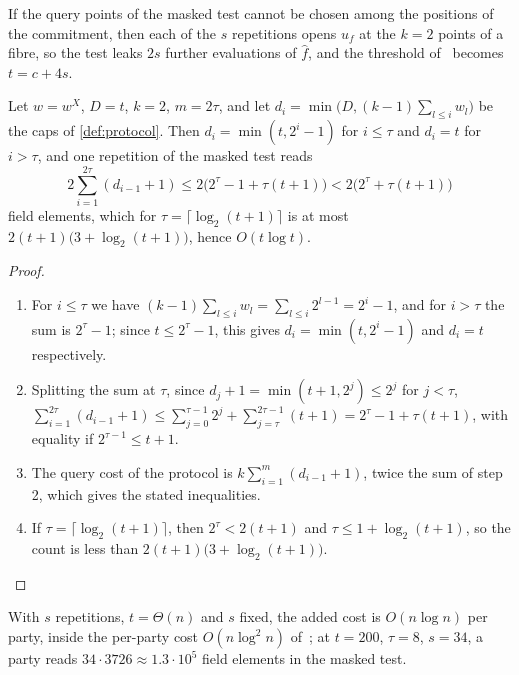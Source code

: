 \begin{remark}\label{rem:avss-leak}
If the query points of the masked test cannot be chosen among the positions of the commitment,
then each of the $s$ repetitions opens $u_f$ at the $k=2$ points of a fibre, so the test leaks
$2s$ further evaluations of $\hat f$, and the threshold of~\cite[\S4, App.~D]{PolyFRIM} becomes
$t=c+4s$.
\end{remark}

\begin{proposition}\label{prop:avss-cost}
Let $w=w^X$, $D=t$, $k=2$, $m=2\tau$, and let $d_i=\min\big(D,(k-1)\sum_{l\le i}w_l\big)$ be
the caps of \cref{def:protocol}. Then $d_i=\min(t,2^i-1)$ for $i\le\tau$ and $d_i=t$ for
$i>\tau$, and one repetition of the masked test reads
\[
2\sum_{i=1}^{2\tau}(d_{i-1}+1)\le2\big(2^\tau-1+\tau(t+1)\big)<2\big(2^\tau+\tau(t+1)\big)
\]
field elements, which for $\tau=\lceil\log_2(t+1)\rceil$ is at most
$2(t+1)\big(3+\log_2(t+1)\big)$, hence $O(t\log t)$.
\end{proposition}

\begin{proof}
\begin{enumerate}
\item For $i\le\tau$ we have $(k-1)\sum_{l\le i}w_l=\sum_{l\le i}2^{l-1}=2^i-1$, and for
$i>\tau$ the sum is $2^\tau-1$; since $t\le2^\tau-1$, this gives $d_i=\min(t,2^i-1)$ and
$d_i=t$ respectively.
\item Splitting the sum at $\tau$,
since $d_j+1=\min(t+1,2^j)\le2^j$ for $j<\tau$,
$\sum_{i=1}^{2\tau}(d_{i-1}+1)\le\sum_{j=0}^{\tau-1}2^j+\sum_{j=\tau}^{2\tau-1}(t+1)=2^\tau-1+\tau(t+1)$, with equality if $2^{\tau-1}\le t+1$.
\item The query cost of the protocol is $k\sum_{i=1}^m(d_{i-1}+1)$, twice the sum of step 2,
which gives the stated inequalities.
\item If $\tau=\lceil\log_2(t+1)\rceil$, then $2^\tau<2(t+1)$ and $\tau\le1+\log_2(t+1)$, so the
count is less than $2(t+1)\big(3+\log_2(t+1)\big)$.
\end{enumerate}
\end{proof}

With $s$ repetitions, $t=\Theta(n)$ and $s$ fixed, the added cost is $O(n\log n)$ per party,
inside the per-party cost $O(n\log^2n)$ of~\cite[\S4]{PolyFRIM}; at $t=200$, $\tau=8$, $s=34$, a
party reads $34\cdot3726\approx1.3\cdot10^{5}$ field elements in the masked test.

